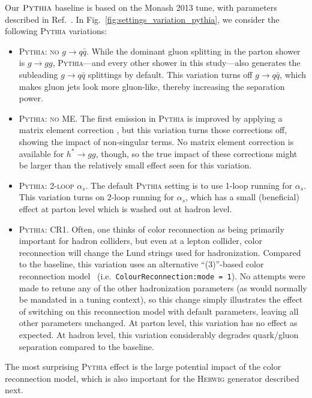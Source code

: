 \documentclass[11pt,letterpaper]{article}
\DeclareRobustCommand{\Fig}[1]{Fig.~\ref{#1}}
\DeclareRobustCommand{\Ref}[1]{Ref.~\cite{#1}}
\begin{document}
Our $\textsc{Pythia}$ baseline is based on the Monash 2013 tune, with parameters described in \Ref{Skands:2014pea}.  In \Fig{fig:settings_variation_pythia}, we consider the following \textsc{Pythia} variations:
\begin{itemize}
\item \textsc{Pythia: no $g \to q\bar{q}$}.  While the dominant gluon splitting in the parton shower is $g \to gg$, \textsc{Pythia}---and every other shower in this study---also generates the subleading $g \to q \bar{q}$ splittings by default.  This variation turns off $g \to q \bar{q}$, which makes gluon jets look more gluon-like, thereby increasing the separation power.
\item \textsc{Pythia: no ME}.  The first emission in \textsc{Pythia} is improved by applying a matrix element correction \cite{Miu:1998ju}, but this variation turns those corrections off, showing the impact of non-singular terms.  No matrix element correction is available for $h^* \to g g$, though, so the true impact of these corrections might be larger than the relatively small effect seen for this variation.
\item \textsc{Pythia: 2-loop $\alpha_s$}.  The default \textsc{Pythia} setting is to use 1-loop running for $\alpha_s$.  This variation turns on 2-loop running for $\alpha_s$, which has a small (beneficial) effect at parton level which is washed out at hadron level.
\item \textsc{Pythia: CR1}.  Often, one thinks of color reconnection as being primarily important for hadron colliders, but even at a lepton collider, color reconnection will change the Lund strings used for hadronization.  Compared to the baseline, this variation uses an alternative ``(3)''-based color reconnection model~\cite{Christiansen:2015yqa} (i.e.~\texttt{ColourReconnection:mode = 1}).  No attempts were made to retune any of the other hadronization parameters (as would normally be mandated in a tuning context), so this change simply illustrates the effect of switching on this reconnection model with default parameters, leaving all other parameters unchanged.  At parton level, this variation has no effect as expected.  At hadron level, this variation considerably degrades quark/gluon separation compared to the baseline.
\end{itemize}
The most surprising \textsc{Pythia} effect is the large potential impact of the color reconnection model, which is also important for the \textsc{Herwig} generator described next.
\end{document}
